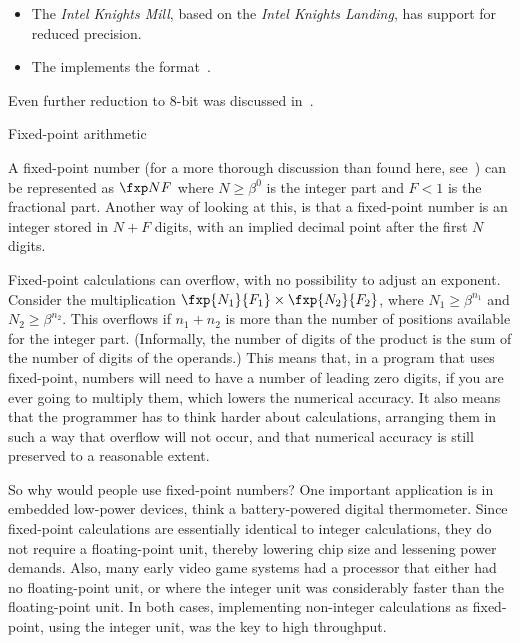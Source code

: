 \begin{itemize}
\item The 
  \emph{Intel Knights Mill}, based
  on the \emph{Intel Knights Landing}, 
  has support for reduced precision.
\item The  implements the
   format~\cite{Intel:bfloat16}.
\end{itemize}

Even further reduction to 8-bit was discussed in~\cite{dettmers:8bit}.

 {Fixed-point arithmetic}

A fixed-point number (for a more thorough discussion than found here,
see~\cite{YatesFixedPoint}) can be represented as $\fxp NF$ where
$N\geq\beta^0$ is the integer part and $F<1$ is the fractional
part. Another way of looking at this, is that a fixed-point number is
an integer stored in $N+F$ digits, with an implied decimal point after
the first $N$ digits.

Fixed-point calculations can overflow, with no possibility to adjust
an exponent. Consider the multiplication $\fxp{N_1}{F_1}\times
\fxp{N_2}{F_2}$, where $N_1\geq \beta^{n_1}$ and $N_2\geq
\beta^{n_2}$. This overflows if $n_1+n_2$ is more than the number of
positions available for the integer part. (Informally, the number of
digits of the product is the sum of the number of digits of the operands.)
This means that, in a program
that uses fixed-point, numbers will need to have a number of
leading zero digits, if you are ever going to multiply them, 
which lowers the numerical accuracy.
It also means that the programmer has to think harder about
calculations, arranging them in such a way that overflow will not
occur, and that numerical accuracy is still preserved to a reasonable
extent.

So why would people use fixed-point numbers? One important application
is in embedded low-power devices, think a battery-powered digital
thermometer. Since fixed-point calculations are essentially identical
to integer calculations, they do not require a floating-point unit,
thereby lowering chip size and lessening power demands. Also, many
early video game systems had a processor that either had no
floating-point unit, or where the integer unit was considerably faster
than the floating-point unit. In both cases, implementing non-integer
calculations as fixed-point, using the integer unit, was the key to
high throughput. 

